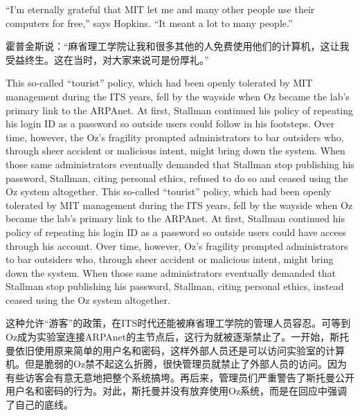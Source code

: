 \ifdefined\eng
``I'm eternally grateful that MIT let me and many other people use their computers for free,'' says Hopkins. ``It meant a lot to many people.''
\fi

\ifdefined\chs
霍普金斯说：``麻省理工学院让我和很多其他的人免费使用他们的计算机，这让我受益终生。这在当时，对大家来说可是份厚礼。''
\fi

\ifdefined\eng
\ifdefined\vone
This so-called ``tourist'' policy, which had been openly tolerated by MIT management during the ITS years, fell by the wayside when Oz became the lab's primary link to the ARPAnet. At first, Stallman continued his policy of repeating his login ID as a password so outside users could follow in his footsteps. Over time, however, the Oz's fragility prompted administrators to bar outsiders who, through sheer accident or malicious intent, might bring down the system. When those same administrators eventually demanded that Stallman stop publishing his password, Stallman, citing personal ethics, refused to do so and ceased using the Oz system altogether.
\fi
\ifdefined\vtwo
This so-called ``tourist'' policy, which had been openly tolerated by MIT management during the ITS years, fell by the wayside when Oz became the lab's primary link to the ARPAnet. At first, Stallman continued his policy of repeating his login ID as a password so outside users could have access through his account. Over time, however, Oz's fragility prompted administrators to bar outsiders who, through sheer accident or malicious intent, might bring down the system. When those same administrators eventually demanded that Stallman stop publishing his password, Stallman, citing personal ethics, instead ceased using the Oz system altogether.
\fi
\fi

\ifdefined\chs
这种允许``游客''的政策，在ITS时代还能被麻省理工学院的管理人员容忍。可等到Oz成为实验室连接ARPAnet的主节点后，这行为就被逐渐禁止了。一开始，斯托曼依旧使用原来简单的用户名和密码，这样外部人员还是可以访问实验室的计算机。但是脆弱的Oz禁不起这么折腾，很快管理员就禁止了外部人员的访问。因为有些访客会有意无意地把整个系统搞垮。再后来，管理员们严重警告了斯托曼公开用户名和密码的行为。对此，斯托曼并没有放弃使用Oz系统，而是在回应中强调了自己的底线。
\fi

